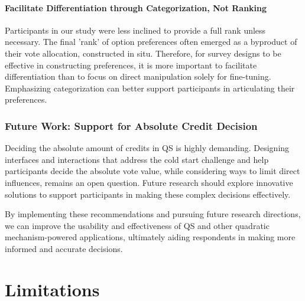 \paragraph{Facilitate Differentiation through Categorization, Not Ranking}
Participants in our study were less inclined to provide a full rank unless necessary. The final 'rank' of option preferences often emerged as a byproduct of their vote allocation, constructed in situ. Therefore, for survey designs to be effective in constructing preferences, it is more important to facilitate differentiation than to focus on direct manipulation solely for fine-tuning. Emphasizing categorization can better support participants in articulating their preferences.

\subsubsection{Future Work: Support for Absolute Credit Decision}
Deciding the absolute amount of credits in QS is highly demanding. Designing interfaces and interactions that address the cold start challenge and help participants decide the absolute vote value, while considering ways to limit direct influences, remains an open question. Future research should explore innovative solutions to support participants in making these complex decisions effectively.

By implementing these recommendations and pursuing future research directions, we can improve the usability and effectiveness of QS and other quadratic mechanism-powered applications, ultimately aiding respondents in making more informed and accurate decisions.



\section{Limitations}
\label{sec:limitations}


